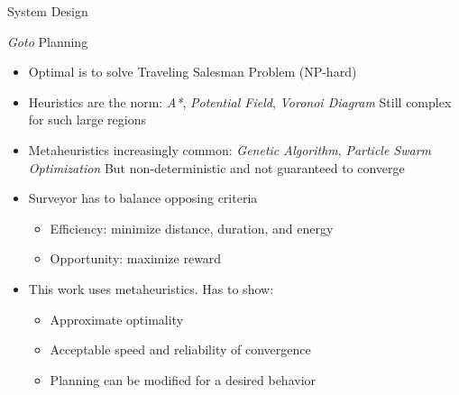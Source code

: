 \documentclass[9pt]{beamer}
\begin{document}
\begin{frame}{System Design}
    \begin{block}{\textit{Goto} Planning}
        \begin{itemize}
	        \item Optimal is to solve Traveling Salesman Problem (NP-hard)
    	    \item Heuristics are the norm: \textit{A*}, \textit{Potential Field}, \textit{Voronoi Diagram} \newline Still complex for such large regions
            \item Metaheuristics increasingly common: \textit{Genetic Algorithm}, \textit{Particle Swarm Optimization} \newline But non-deterministic and not guaranteed to converge
	        \item Surveyor has to balance opposing criteria
	        \begin{itemize}
	            \item Efficiency: minimize distance, duration, and energy
	            \item Opportunity: maximize reward
	        \end{itemize}
	        \item This work uses metaheuristics. Has to show: 
	        \begin{itemize}
	            \item Approximate optimality
	            \item Acceptable speed and reliability of convergence
	            \item Planning can be modified for a desired behavior
	        \end{itemize}
        \end{itemize}
    \end{block}
\end{frame}
\end{document}
